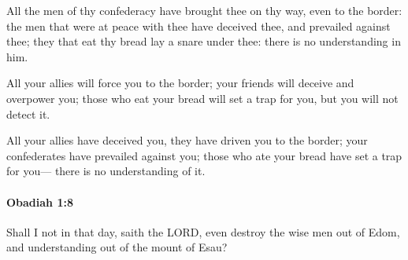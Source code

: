 			\begin{versebox}
					\item[BHS] 
					\item[LXX] 
					\item[ASV] All the men of thy confederacy have brought thee on thy way, even to the border: the men that were at peace with thee have deceived thee, and prevailed against thee; they that eat thy bread lay a snare under thee: there is no understanding in him.
					\item[NIV] All your allies will force you to the border; your friends will deceive and overpower you; those who eat your bread will set a trap for you, but you will not detect it.
					\item[NRSV] All your allies have deceived you, they have driven you to the border; your confederates have prevailed against you; those who ate your bread have set a trap for you— there is no understanding of it.
			\end{versebox}

		\paragraph{Obadiah 1:8} %
			\label{OBADIAH-1-8}

			Shall I not in that day, saith the LORD, even destroy the wise men out of Edom, and understanding out of the mount of Esau?

